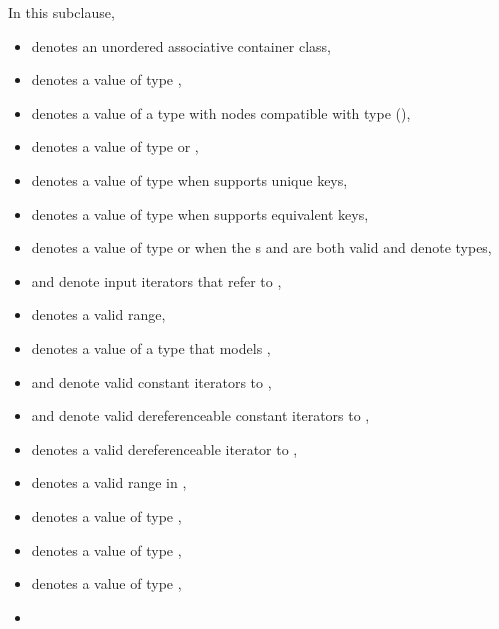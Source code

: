\pnum
{}%
%
%
%
%
%
In this subclause,
\begin{itemize}
\item
{} denotes an unordered associative container class,
\item
{} denotes a value of type ,
\item
{} denotes a value of a type with nodes compatible
  with type  (),
\item
{} denotes a value of type  or ,
\item
{} denotes a value of type 
  when  supports unique keys,
\item
{} denotes a value of type 
  when  supports equivalent keys,
\item
{} denotes a value of type  or 
  when the s
   and
  are both valid and denote types,
\item
{} and  denote input iterators
  that refer to ,
\item
{} denotes a valid range,
\item
{} denotes a value of a type 
that models ,
\item
{} and  denote valid constant iterators to ,
\item
{} and  denote
  valid dereferenceable constant iterators to ,
\item
{} denotes a valid dereferenceable iterator to ,
\item
{} denotes a valid range in ,
\item
{} denotes a value of type ,
\item
{} denotes a value of type ,
\item
{} denotes a value of type ,
\item

\end{itemize}
